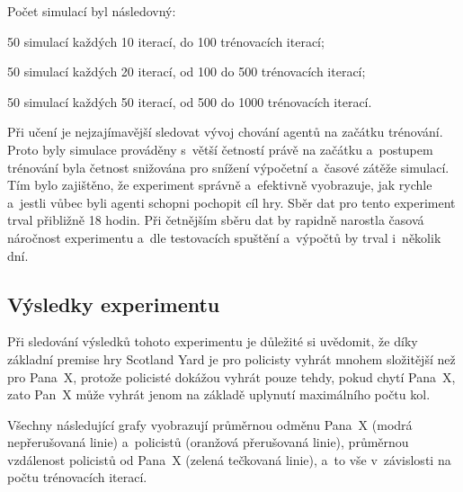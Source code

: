 Počet simulací byl následovný:
\begin{myitemize}
  \item 50 simulací každých 10 iterací, do 100 trénovacích iterací;
  \item 50 simulací každých 20 iterací, od 100 do 500 trénovacích iterací;
  \item 50 simulací každých 50 iterací, od 500 do 1000 trénovacích iterací.
\end{myitemize}

Při učení je nejzajímavější sledovat vývoj chování agentů na začátku trénování.
Proto byly simulace prováděny s~větší četností právě na začátku a~postupem trénování byla četnost snižována pro snížení výpočetní a~časové zátěže simulací.
Tím bylo zajištěno, že experiment správně a~efektivně vyobrazuje, jak rychle a~jestli vůbec byli agenti schopni pochopit cíl hry.
Sběr dat pro tento experiment trval přibližně 18 hodin.
Při četnějším sběru dat by rapidně narostla časová náročnost experimentu a~dle testovacích spuštění a~výpočtů by trval i~několik dní.

\subsection{Výsledky experimentu}
\label{subsec:vysledky-experimentu-1}

Při sledování výsledků tohoto experimentu je důležité si uvědomit, že díky základní premise hry Scotland Yard je pro policisty vyhrát mnohem složitější než pro Pana~X, protože policisté dokážou vyhrát pouze tehdy, pokud chytí Pana~X, zato Pan~X může vyhrát jenom na základě uplynutí maximálního počtu kol.

Všechny následující grafy vyobrazují průměrnou odměnu Pana~X (modrá nepřerušovaná linie) a~policistů (oranžová přerušovaná linie), průměrnou vzdálenost policistů od Pana~X (zelená tečkovaná linie), a~to vše v~závislosti na počtu trénovacích iterací.

